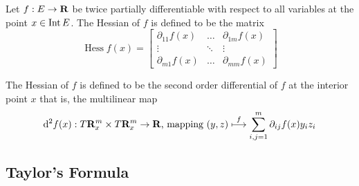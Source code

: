 \begin{definition}
    Let \(f: E \to \mathbf{R}\) be twice partially differentiable with respect to all
    variables at the point \(x \in \operatorname{Int} E\). The Hessian of \(f\) is defined to be
    the matrix
    \[
        \operatorname{Hess} f(x) =
        \begin{bmatrix}
            \partial_{1 1} f(x) & \dots  & \partial_{1 m} f(x) \\
            \vdots              & \ddots & \vdots              \\
            \partial_{m 1} f(x) & \dots  & \partial_{m m} f(x)
        \end{bmatrix}
    \]
\end{definition}

\begin{definition}
    The Hessian of \(f\) is defined to be the second order differential of \(f\)
    at the interior point \(x\) that is, the multilinear map
    \[
        \mathrm{d}^2 f(x): T\mathbf{R}^m_x \times T\mathbf{R}^m_x \to \mathbf{R}\text{, mapping }
        (y, z) \overset f \longmapsto \sum_{i, j = 1}^m \partial_{ij} f(x) y_i z_i
    \]
\end{definition}

\subsection{Taylor's Formula}

